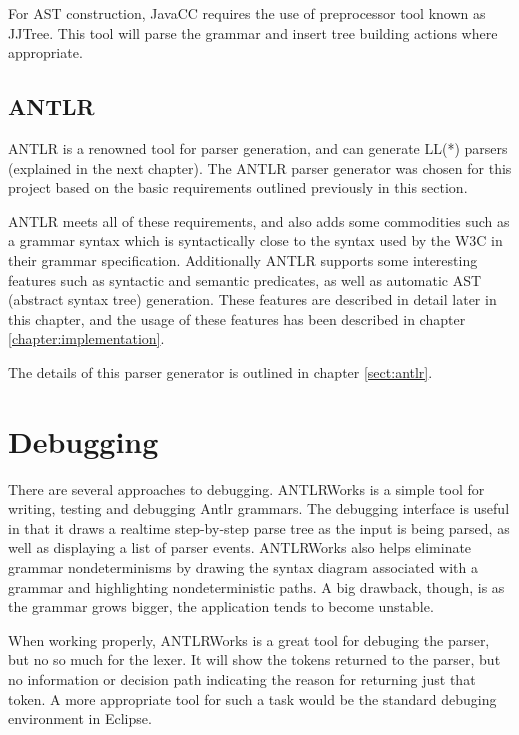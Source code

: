 For AST construction, JavaCC requires the use of preprocessor tool known as  
JJTree. This tool will parse the grammar and insert tree building actions where
appropriate. 

\subsection{ANTLR}
ANTLR is a renowned tool for parser generation, and can generate LL(*) parsers
(explained in the next chapter). The ANTLR parser generator was chosen for this
project based on the basic requirements outlined previously in this section.  

ANTLR meets all of these requirements, and also adds some commodities such as a
grammar syntax which is syntactically close to the syntax used by the W3C in
their grammar specification\cite{w3c01}. Additionally ANTLR supports some
interesting features such as syntactic and semantic predicates, as well as
automatic AST (abstract syntax tree) generation. These features are described in
detail later in this chapter, and the usage of these features has been described
in chapter \ref{chapter:implementation}.

The details of this parser generator is outlined in chapter \ref{sect:antlr}.

\section{Debugging}
\label{sect:method:debugging}
There are several approaches to debugging. ANTLRWorks \cite{antlrwrks00} is a
simple tool for writing, testing and debugging Antlr grammars. The debugging
interface is useful in that it draws a realtime step-by-step parse tree as the
input is being parsed, as well as displaying a list of parser events.
ANTLRWorks also helps eliminate grammar nondeterminisms by drawing the syntax
diagram associated with a grammar and highlighting nondeterministic paths. A
big drawback, though, is as the grammar grows bigger, the application tends to
become unstable.    

When working properly, ANTLRWorks is a great tool for debuging the parser, but
no so much for the lexer. It will show the tokens returned to the parser, but
no information or decision path indicating the reason for returning just that
token. A more appropriate tool for such a task would be the standard debuging
environment in Eclipse\cite{eclipse}.
